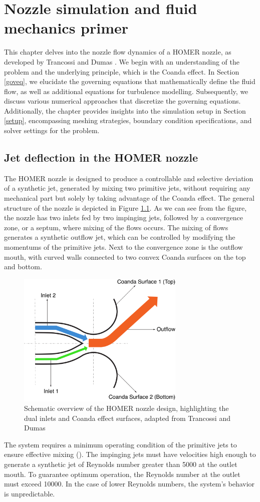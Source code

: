 \chapter{Nozzle simulation and fluid mechanics primer}
\label{chap:Theory-CFD}
This chapter delves into the nozzle flow dynamics of a \gls{HOMER} nozzle, as developed by Trancossi and Dumas \cite{trandum}. We begin with an understanding of the problem and the underlying principle, which is the Coanda effect. In Section \ref{goveq}, we elucidate the governing equations that mathematically define the fluid flow, as well as additional equations for turbulence modelling. Subsequently, we discuss various numerical approaches that discretize the governing equations. Additionally, the chapter provides insights into the simulation setup in Section \ref{setup}, encompassing meshing strategies, boundary condition specifications, and solver settings for the problem. 
\section{Jet deflection in the HOMER nozzle}  
The HOMER nozzle is designed to produce a controllable and selective deviation of a synthetic jet, generated by mixing two primitive jets, without requiring any mechanical part but solely by taking advantage of the Coanda effect. The general structure of the nozzle is depicted in Figure \ref{fig:nozzle}. As we can see from the figure, the nozzle has two inlets fed by two impinging jets, followed by a convergence zone, or a septum, where mixing of the flows occurs. The mixing of flows generates a synthetic outflow jet, which can be controlled by modifying the momentums of the primitive jets. Next to the convergence zone is the outflow mouth, with curved walls connected to two convex Coanda surfaces on the top and bottom.
\begin{figure}[ht]
  \centering
  \includegraphics[width=8cm]{images/Theory-CFD/nozzle.png}
  \caption{Schematic overview of the HOMER nozzle design, highlighting the dual inlets and Coanda effect surfaces, adapted from Trancossi and Dumas \cite{trandum}}
  \label{fig:nozzle}
\end{figure}
The system requires a minimum operating condition of the primitive jets to ensure effective mixing (\cite{trandum}). The impinging jets must have velocities high enough to generate a synthetic jet of Reynolds number greater than 5000 at the outlet mouth. To guarantee optimum operation, the Reynolds number at the outlet must exceed 10000. In the case of lower Reynolds numbers, the system's behavior is unpredictable. 
